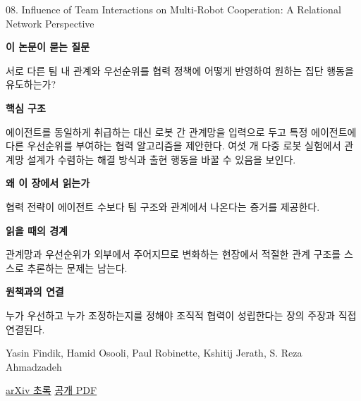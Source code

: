 \documentclass[11pt,openany]{book}
\begin{document}
\begin{termcard}{08. Influence of Team Interactions on Multi-Robot Cooperation: A Relational Network Perspective}

\par

\medskip

{\sffamily\bfseries\color{deepblue} 이 논문이 묻는 질문}\par

서로 다른 팀 내 관계와 우선순위를 협력 정책에 어떻게 반영하여 원하는 집단 행동을 유도하는가?

\smallskip

{\sffamily\bfseries\color{deepblue} 핵심 구조}\par

에이전트를 동일하게 취급하는 대신 로봇 간 관계망을 입력으로 두고 특정 에이전트에 다른 우선순위를 부여하는 협력 알고리즘을 제안한다. 여섯 개 다중 로봇 실험에서 관계망 설계가 수렴하는 해결 방식과 출현 행동을 바꿀 수 있음을 보인다.

\smallskip

{\sffamily\bfseries\color{deepblue} 왜 이 장에서 읽는가}\par

협력 전략이 에이전트 수보다 팀 구조와 관계에서 나온다는 증거를 제공한다.

\smallskip

{\sffamily\bfseries\color{coral} 읽을 때의 경계}\par

관계망과 우선순위가 외부에서 주어지므로 변화하는 현장에서 적절한 관계 구조를 스스로 추론하는 문제는 남는다.

\smallskip

{\sffamily\bfseries\color{teal} 원책과의 연결}\par

누가 우선하고 누가 조정하는지를 정해야 조직적 협력이 성립한다는 장의 주장과 직접 연결된다.

\medskip

{\footnotesize\color{muted} Yasin Findik, Hamid Osooli, Paul Robinette, Kshitij Jerath, S. Reza Ahmadzadeh\par

\href{https://arxiv.org/abs/2310.12910}{arXiv 초록} \quad \href{https://arxiv.org/pdf/2310.12910}{공개 PDF}\par}

\end{termcard}
\end{document}
